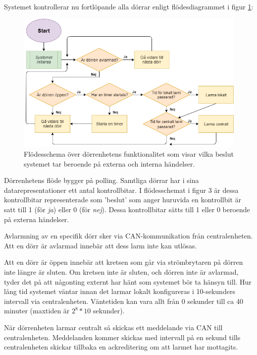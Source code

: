 \documentclass{article}
\begin{document}
Systemet kontrollerar nu fortlöpande alla dörrar enligt flödesdiagrammet i figur \ref{fig:dörrflöde}:



\begin{figure}[H]
\begin{flushleft}
\end{flushleft}
\centering
\includegraphics[scale=0.5]{figurer/Flow-Chart.png}
\caption{Flödesschema över dörrenhetens funktionalitet som visar vilka beslut systemet tar beroende på externa och interna händelser.}
\label{fig:dörrflöde}
\end{figure}

Dörrenhetens flöde bygger på polling. Samtliga dörrar har i sina datarepresentationer
ett antal kontrollbitar. I flödesschemat i figur 3 är dessa kontrollbitar representerade
som 'beslut' som anger huruvida en kontrollbit är satt till 1 (för \textit{ja}) eller 0
(för \textit{nej}). Dessa kontrollbitar sätts till 1 eller 0 beroende på externa händelser.

Avlarmning av en specifik dörr sker via CAN-kommunikation från centralenheten. Att en dörr är avlarmad
innebär att dess larm inte kan utlösas.

Att en dörr är öppen innebär att kretsen som går via strömbrytaren på dörren inte längre är sluten.
Om kretsen inte är sluten, och dörren inte är avlarmad, tyder det på att någonting externt har hänt
som systemet bör ta hänsyn till. Hur lång tid systemet väntar innan det larmar lokalt konfigureras i
 10-sekunders intervall via centralenheten. Väntetiden kan vara allt från 0 sekunder till ca 40 minuter
   (maxtiden är $2^8 *10$ sekunder).

När dörrenheten larmar centralt så skickas ett meddelande via CAN till centralenheten. Meddelanden
kommer skickas med intervall på en sekund tills centralenheten skickar tillbaka en ackreditering om att larmet har
 mottagits.
\end{document}
